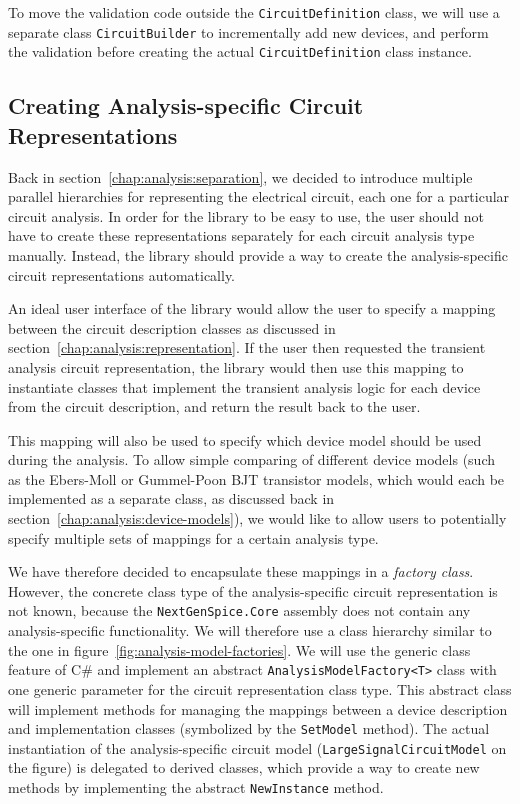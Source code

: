 To move the validation code outside the \texttt{CircuitDefinition} class, we will use a separate class \texttt{CircuitBuilder} to incrementally add new devices, and perform the validation before creating the actual \texttt{CircuitDefinition} class instance.

\subsection{Creating Analysis-specific Circuit Representations}
Back in section~\ref{chap:analysis:separation}, we decided to introduce multiple parallel hierarchies for representing the electrical circuit, each one for a particular circuit analysis. In order for the library to be easy to use, the user should not have to create these representations separately for each circuit analysis type manually. Instead, the library should provide a way to create the analysis-specific circuit representations automatically.

An ideal user interface of the library would allow the user to specify a mapping between the circuit description classes as discussed in section~\ref{chap:analysis:representation}. If the user then requested the transient analysis circuit representation, the library would then use this mapping to instantiate classes that implement the transient analysis logic for each device from the circuit description, and return the result back to the user.

This mapping will also be used to specify which device model should be used during the analysis. To allow simple comparing of different device models (such as the Ebers-Moll or Gummel-Poon BJT transistor models, which would each be implemented as a separate class, as discussed back in section~\ref{chap:analysis:device-models}), we would like to allow users to potentially specify multiple sets of mappings for a certain analysis type.

We have therefore decided to encapsulate these mappings in a \textit{factory class}. However, the concrete class type of the analysis-specific circuit representation is not known, because the \texttt{NextGenSpice.Core} assembly does not contain any analysis-specific functionality. We will therefore use a class hierarchy similar to the one in figure~\ref{fig:analysis-model-factories}. We will use the generic class feature of C\# and implement an abstract \texttt{AnalysisModelFactory<T>} class with one generic parameter for the circuit representation class type. This abstract class will implement methods for managing the mappings between a device description and implementation classes (symbolized by the \texttt{SetModel} method). The actual instantiation of the analysis-specific circuit model (\texttt{LargeSignalCircuitModel} on the figure) is delegated to derived classes, which provide a way to create new methods by implementing the abstract \texttt{NewInstance} method.

